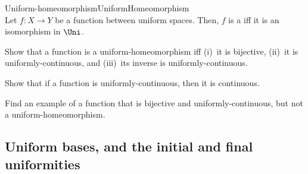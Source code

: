 \begin{dfn}{Uniform-homeomorphism}{UniformHomeomorphism}
\\
Let $f\colon X\rightarrow Y$ be a function between uniform spaces.  Then, $f$ is a  iff it is an isomorphism in $\Uni$.
\end{dfn}
\begin{exr}{}{}
Show that a function is a uniform-homeomorphism iff (i)~it is bijective, (ii)~it is uniformly-continuous, and (iii)~its inverse is uniformly-continuous.
\end{exr}
\begin{exr}{}{}
Show that if a function is uniformly-continuous, then it is continuous.
\end{exr}
\begin{exr}{}{}
Find an example of a function that is bijective and uniformly-continuous, but not a uniform-homeomorphism.
\end{exr}

\subsection[Uniform bases and the initial/final uniformities]{Uniform bases, and the initial and final uniformities}

